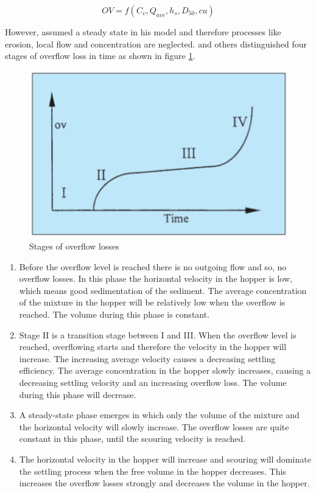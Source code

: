 \begin{equation}
\label{eq:OV}
    OV = f(C_v, Q_{ave}, h_s, D_{50}, cu)
\end{equation} \newline

\noindent However, \cite{Ooijens} assumed a steady state in his model and therefore processes like erosion, local flow and concentration are neglected. \cite{Ooijens} and others distinguished four stages of overflow loss in time as shown in figure \ref{fig:phases_overflow_loss}.

\begin{figure}[ht!]
    \centering
    \includegraphics[width=.5\linewidth]{Images/Phases_overflow_loss.png}
    \caption{Stages of overflow losses}
    \label{fig:phases_overflow_loss}
\end{figure}

\begin{enumerate}[I]
    \item Before the overflow level is reached there is no outgoing flow and so, no overflow losses. In this phase the horizontal velocity in the hopper is low, which means good sedimentation of the sediment. The average concentration of the mixture in the hopper will be relatively low when the overflow is reached. The volume during this phase is constant.
    \item Stage II is a transition stage between I and III. When the overflow level is reached, overflowing starts and therefore the velocity in the hopper will increase. The increasing average velocity causes a decreasing settling efficiency. The average concentration in the hopper slowly increases, causing a decreasing settling velocity and an increasing overflow loss. The volume during this phase will decrease.
    \item A steady-state phase emerges in which only the volume of the mixture and the horizontal velocity will slowly increase. The overflow losses are quite constant in this phase, until the scouring velocity is reached.
    \item The horizontal velocity in the hopper will increase and scouring will dominate the settling process when the free volume in the hopper decreases. This increases the overflow losses strongly and decreases the volume in the hopper.
\end{enumerate}

